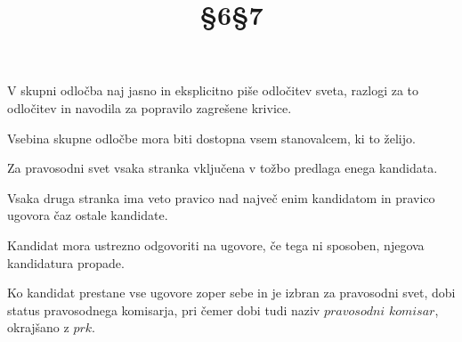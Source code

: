 \documentclass[a4paper]{article}
\begin{document}
\begin{center}
\large V skupni odločba naj jasno in eksplicitno piše odločitev sveta, razlogi za to odločitev in navodila za popravilo zagrešene krivice.

\large Vsebina skupne odločbe mora biti dostopna vsem stanovalcem, ki to želijo. 

\Large\title{§6}

\large Za pravosodni svet vsaka stranka vključena v tožbo predlaga enega kandidata.

\large Vsaka druga stranka ima veto pravico nad največ enim kandidatom in pravico ugovora čaz ostale kandidate.

\large Kandidat mora ustrezno odgovoriti na ugovore, če tega ni sposoben, njegova kandidatura propade.

\large Ko kandidat prestane vse ugovore zoper sebe in je izbran za pravosodni svet, dobi status pravosodnega komisarja, pri čemer dobi tudi naziv $pravosodni$ $komisar$, okrajšano z $prk$.

\Large\title{§7}



\end{center}
\end{document}
